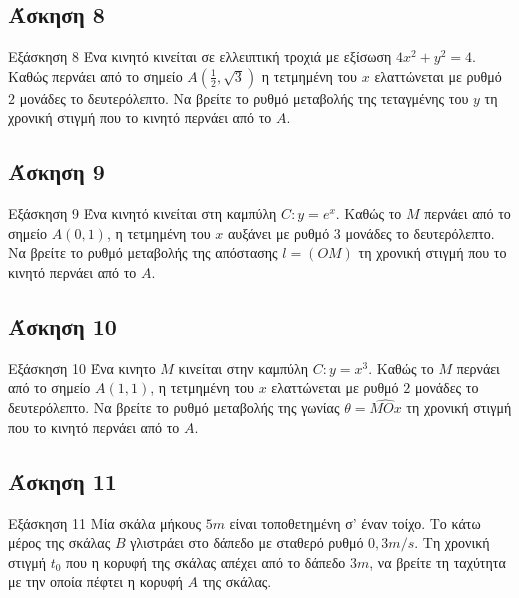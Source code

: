 \documentclass[greek]{beamer}
\begin{document}
\subsection{Άσκηση 8}
\begin{frame}[label=Άσκηση8]{Εξάσκηση 8}
  Ένα κινητό κινείται σε ελλειπτική τροχιά με εξίσωση $4x^2+y^2=4$. Καθώς περνάει από το σημείο $Α(\frac{1}{2},\sqrt{3})$ η τετμημένη του $x$ ελαττώνεται με ρυθμό $2$ μονάδες το δευτερόλεπτο. Να βρείτε το ρυθμό μεταβολής της τεταγμένης του $y$ τη χρονική στιγμή που το κινητό περνάει από το $Α$.

\end{frame}

\subsection{Άσκηση 9}
\begin{frame}[label=Άσκηση9]{Εξάσκηση 9}
  Ένα κινητό κινείται στη καμπύλη $C:y=e^x$. Καθώς το $Μ$ περνάει από το σημείο $Α(0,1)$, η τετμημένη του $x$ αυξάνει με ρυθμό $3$ μονάδες το δευτερόλεπτο. Να βρείτε το ρυθμό μεταβολής της απόστασης $l=(ΟΜ)$ τη χρονική στιγμή που το κινητό περνάει από το $Α$.

\end{frame}

\subsection{Άσκηση 10}
\begin{frame}[label=Άσκηση10]{Εξάσκηση 10}
  Ένα κινητο $Μ$ κινείται στην καμπύλη $C:y=x^3$. Καθώς το $Μ$ περνάει από το σημείο $Α(1,1)$, η τετμημένη του $x$ ελαττώνεται με ρυθμό $2$ μονάδες το δευτερόλεπτο. Να βρείτε το ρυθμό μεταβολής της γωνίας $θ=\hat{ΜΟx}$ τη χρονική στιγμή που το κινητό περνάει από το $Α$.

\end{frame}

\subsection{Άσκηση 11}
\begin{frame}[label=Άσκηση11]{Εξάσκηση 11}
  Μία σκάλα μήκους $5m$ είναι τοποθετημένη σ' έναν τοίχο. Το κάτω μέρος της σκάλας $Β$ γλιστράει στο δάπεδο με σταθερό ρυθμό $0,3m/s$. Τη χρονική στιγμή $t_0$ που η κορυφή της σκάλας απέχει από το δάπεδο $3m$, να βρείτε τη ταχύτητα με την οποία πέφτει η κορυφή $Α$ της σκάλας.

\end{frame}
\end{document}
